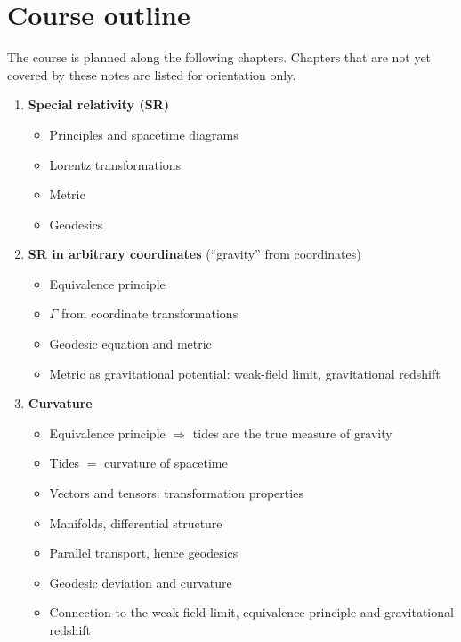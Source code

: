\section*{Course outline}

The course is planned along the following chapters. Chapters that are not yet covered by
these notes are listed for orientation only.

\begin{enumerate}[leftmargin=*, itemsep=0.6ex]
    \item \textbf{Special relativity (SR)}
          \begin{itemize}[nosep]
              \item Principles and spacetime diagrams
              \item Lorentz transformations
              \item Metric
              \item Geodesics
          \end{itemize}
    \item \textbf{SR in arbitrary coordinates} (``gravity'' from coordinates)
          \begin{itemize}[nosep]
              \item Equivalence principle
              \item $\Gamma$ from coordinate transformations
              \item Geodesic equation and metric
              \item Metric as gravitational potential: weak-field limit, gravitational redshift
          \end{itemize}
    \item \textbf{Curvature}
          \begin{itemize}[nosep]
              \item Equivalence principle $\Rightarrow$ tides are the true measure of gravity
              \item Tides $=$ curvature of spacetime
              \item Vectors and tensors: transformation properties
              \item Manifolds, differential structure
              \item Parallel transport, hence geodesics
              \item Geodesic deviation and curvature
              \item Connection to the weak-field limit, equivalence principle and gravitational redshift

\end{itemize}
\end{enumerate}
